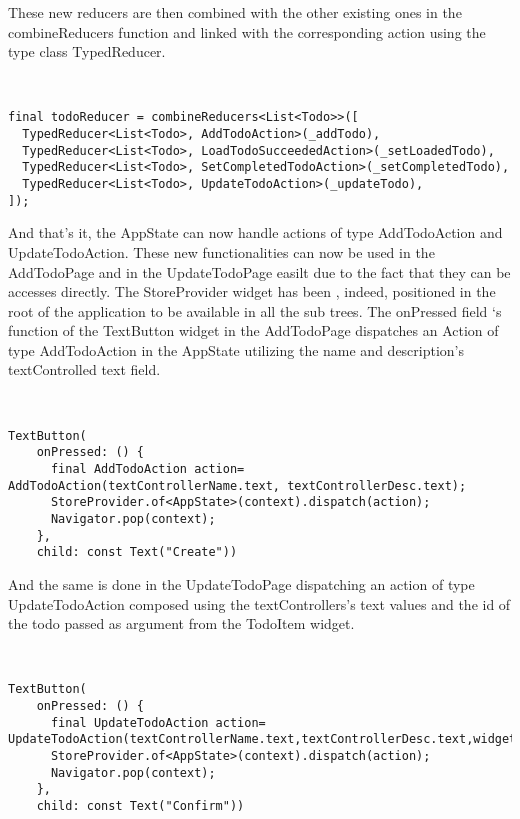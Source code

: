 These new reducers are then combined with the other existing ones in the combineReducers function and linked with the corresponding action using the type class TypedReducer.
\begin{code}
\mbox{}\\
 \mbox{}
		\label{code:2.14}
\begin{verbatim}
final todoReducer = combineReducers<List<Todo>>([
  TypedReducer<List<Todo>, AddTodoAction>(_addTodo),
  TypedReducer<List<Todo>, LoadTodoSucceededAction>(_setLoadedTodo),
  TypedReducer<List<Todo>, SetCompletedTodoAction>(_setCompletedTodo),
  TypedReducer<List<Todo>, UpdateTodoAction>(_updateTodo),
]);
\end{verbatim}
\mbox{}
\end{code}

And that’s it, the AppState can now handle actions of type AddTodoAction and UpdateTodoAction. These new functionalities can now be used in the AddTodoPage and in the UpdateTodoPage easilt due to the fact that they can be accesses directly. The StoreProvider widget has been , indeed, positioned in the root of the application to be available in all the sub trees. The onPressed field ‘s function of the TextButton widget in the AddTodoPage dispatches an Action of type AddTodoAction in the AppState utilizing the name and description’s textControlled text field.
\begin{code}
\mbox{}\\
 \mbox{}
		\label{code:2.14}
\begin{verbatim}
TextButton(
    onPressed: () {
      final AddTodoAction action= AddTodoAction(textControllerName.text, textControllerDesc.text);
      StoreProvider.of<AppState>(context).dispatch(action);
      Navigator.pop(context);
    },
    child: const Text("Create"))
\end{verbatim}
\mbox{}
\end{code}

And the same is done in the UpdateTodoPage dispatching an action of type UpdateTodoAction composed using the textControllers’s text values and the id of the todo passed as argument from the TodoItem widget.
\begin{code}
\mbox{}\\
 \mbox{}
		\label{code:2.14}
\begin{verbatim}
TextButton(
    onPressed: () {
      final UpdateTodoAction action= UpdateTodoAction(textControllerName.text,textControllerDesc.text,widget.todo.id);
      StoreProvider.of<AppState>(context).dispatch(action);
      Navigator.pop(context);
    },
    child: const Text("Confirm"))
\end{verbatim}
\mbox{}
\end{code}

